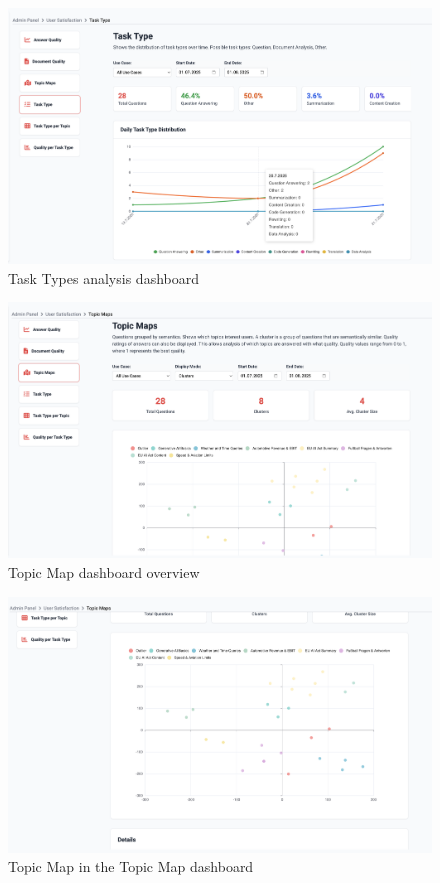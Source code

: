 \documentclass[
	english,
	ruledheaders=section,%
	class=report,%
	thesis={type=bachelor},%
	accentcolor=1b,%
	custommargins=true,%
	marginpar=false,%
	parskip=half-,%
	fontsize=11pt,%
	DIV=14,
]{tudapub}
\begin{document}
\begin{figure}[h!]
    \includegraphics[width=0.75\linewidth]{images/TaskTypes.png}
    \captionsetup{list=no}
    \caption{Task Types analysis dashboard}
    \label{fig:task_types}
\end{figure}

\begin{figure}[h!]
    \includegraphics[width=0.75\linewidth]{images/TopicMapsOverview.png}
    \captionsetup{list=no}
    \caption{Topic Map dashboard overview}
    \label{fig:topic_maps_overview}
\end{figure}

\begin{figure}[h!]
    \includegraphics[width=0.75\linewidth]{images/TopicMapsMap.png}
    \captionsetup{list=no}
    \caption{Topic Map in the Topic Map dashboard}
    \label{fig:topic_maps_maps}
\end{figure}
\end{document}

